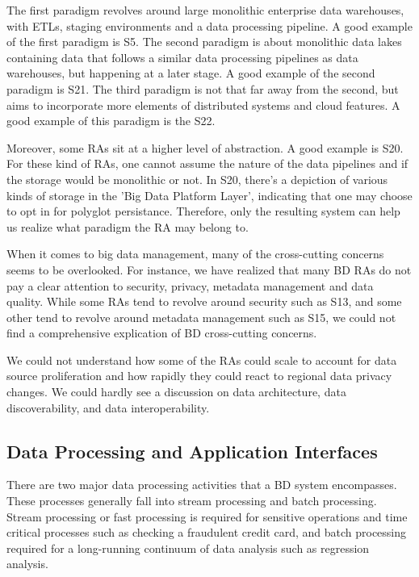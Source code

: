 \documentclass{ieeeaccess}
\begin{document}
The first paradigm revolves around large monolithic enterprise data warehouses, with ETLs, staging environments and a data processing pipeline. A good example of the first paradigm is S5. The second paradigm is about monolithic data lakes containing data that follows a similar data processing pipelines as data warehouses, but happening at a later stage. A good example of the second paradigm is S21. The third paradigm is not that far away from the second, but aims to incorporate more elements of distributed systems and cloud features. A good example of this paradigm is the S22.

Moreover, some RAs sit at a higher level of abstraction. A good example is S20. For these kind of RAs, one cannot assume the nature of the data pipelines and if the storage would be monolithic or not. In S20, there's a depiction of various kinds of storage in the 'Big Data Platform Layer', indicating that one may choose to opt in for polyglot persistance. Therefore, only the resulting system can help us realize what paradigm the RA may belong to. 

When it comes to big data management, many of the cross-cutting concerns seems to be overlooked. For instance, we have realized that many BD RAs do not pay a clear attention to security, privacy, metadata management and data quality. While some RAs tend to revolve around security such as S13, and some other tend to revolve around metadata management such as S15, we could not find a comprehensive explication of BD cross-cutting concerns.

We could not understand how some of the RAs could scale to account for data source proliferation and how rapidly they could react to regional data privacy changes. We could hardly see a discussion on data architecture, data discoverability, and data interoperability.

\subsection{Data Processing and Application Interfaces}

There are two major data processing activities that a BD system encompasses. These processes generally fall into stream processing and batch processing. Stream processing or fast processing is required for sensitive operations and time critical processes such as checking a fraudulent credit card, and batch processing required for a long-running continuum of data analysis such as regression analysis. 
\end{document}
